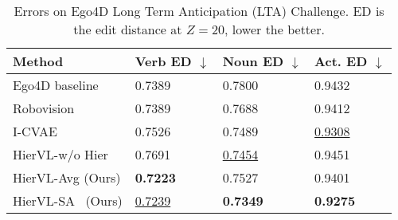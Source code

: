\documentclass[10pt,twocolumn,letterpaper]{article}
\newcommand{\modelname}[0]{{HierVL}}
\begin{document}
{
 \setlength{\tabcolsep}{1pt}
 \setlength{\extrarowheight}{1.5pt}
\begin{table}[t]\footnotesize
\begin{center}
\begin{tabular}{ L{3.0cm}||C{1.6cm}|C{1.6cm}|C{1.6cm}  }

 \hline
 Method& Verb ED $\downarrow$ & Noun ED $\downarrow$ & Act. ED $\downarrow$ \\
 \hline
 Ego4D baseline \cite{ego4d}   &  0.7389   & 0.7800 & 0.9432 \\
  Robovision \cite{lta-srijan}   &  0.7389   & 0.7688 & 0.9412 \\
  I-CVAE \cite{intention}   &  0.7526   & 0.7489 & \underline{0.9308} \\
 \modelname-w/o Hier & 0.7691 & \underline{0.7454} & 0.9451\\
\modelname-Avg (Ours) & \textbf{0.7223} & 0.7527 & 0.9401 \\
 \modelname-SA ~(Ours)& \underline{0.7239} & \textbf{0.7349} & \textbf{0.9275} \\
 \hline
\end{tabular}

\end{center}
\vspace{-0.2in}
\caption{Errors on Ego4D Long Term Anticipation (LTA) Challenge. ED is the edit distance at $Z=20$, lower the better.}
\label{tab:lta}
\vspace{-3mm}
\end{table}

} 
\end{document}
